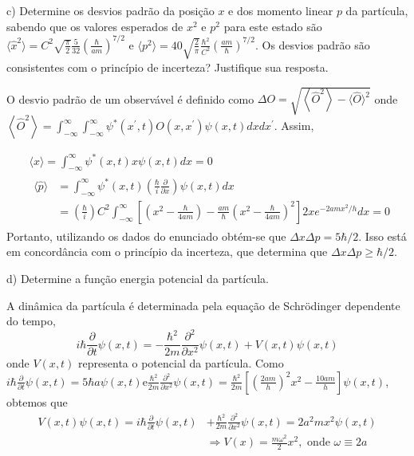 \begin{enumerate}[start=1,label={\bfseries Q\arabic*.}]
  c) Determine os desvios padrão da posição $x$ e dos momento linear $p$ da partícula, sabendo que os valores esperados de $x^{2}$ e $p^{2}$ para este estado são $\langle \hat{x}^{2} \rangle = C^{2} \sqrt{\frac{\pi}{2}} \frac{5}{32} \left(\frac{\hbar}{am}\right)^{7/2}$ e $\langle p^{2} \rangle = 40 \sqrt{\frac{2}{\pi}} \frac{\hbar^{2}}{C^{2}} \left(\frac{am}{\hbar}\right)^{7/2}$. Os desvios padrão são consistentes com o princípio de incerteza? Justifique sua resposta.

  \resposta O desvio padrão de um observável é definido como $\Delta O=\sqrt{\left\langle\hat{O}^{2}\right\rangle-\langle\hat{O}\rangle^{2}}$ onde $ \left\langle\hat{O}^{2}\right\rangle = \int_{-\infty}^{\infty} \int_{-\infty}^{\infty} \psi^{*}\left(x^{\prime}, t\right) O\left(x, x^{\prime}\right) \psi(x, t) d x d x^{\prime}$. Assim,

$$\begin{aligned}
&\langle\hat{x}\rangle=\int_{-\infty}^{\infty} \psi^{*}(x, t) x \psi(x, t) d x=0\\
&\begin{aligned}
\langle\hat{p}\rangle &=\int_{-\infty}^{\infty} \psi^{*}(x, t)\left(\frac{\hbar}{i} \frac{\partial}{\partial x}\right) \psi(x, t) d x \\
&=\left(\frac{\hbar}{i}\right) C^{2} \int_{-\infty}^{\infty}\left[\left(x^{2}-\frac{\hbar}{4 a m}\right)-\frac{a m}{\hbar}\left(x^{2}-\frac{\hbar}{4 a m}\right)^{2}\right] 2 x e^{-2 a m x^{2} / h} d x=0
\end{aligned}
\end{aligned}
$$
Portanto, utilizando os dados do enunciado obtém-se que $\Delta x \Delta p = 5\hbar /2$. Isso está em concordância com o princípio da incerteza, que determina que $\Delta x \Delta p \geq \hbar/2$.


d) Determine a função energia potencial da partícula.

\resposta A dinâmica da partícula é determinada pela equação de Schrödinger dependente do tempo,
$$
i \hbar \frac{\partial}{\partial t} \psi(x, t)=-\frac{\hbar^{2}}{2 m} \frac{\partial^{2}}{\partial x^{2}} \psi(x, t)+V(x, t) \psi(x, t)
$$
onde $V(x,t)$ representa o potencial da partícula. Como $i \hbar \frac{\partial}{\partial t} \psi(x, t)=5 \hbar a \psi(x, t) \mathrm{e} \frac{\hbar^{2}}{2 m} \frac{\partial^{2}}{\partial x^{2}} \psi(x, t)= \frac{\hbar^{2}}{2 m}\left[\left(\frac{2 a m}{h}\right)^{2} x^{2}-\frac{10 a m}{h}\right] \psi(x, t) $, obtemos que
$$
\begin{aligned}
V(x, t) \psi(x, t)=i \hbar \frac{\partial}{\partial t} \psi(x, t) &+\frac{\hbar^{2}}{2 m} \frac{\partial^{2}}{\partial x^{2}} \psi(x, t)=2 a^{2} m x^{2} \psi(x, t) \\
& \Longrightarrow V(x)=\frac{m \omega^{2}}{2} x^{2}, \text { onde } \omega \equiv 2 a
\end{aligned}
$$








\end{enumerate}
